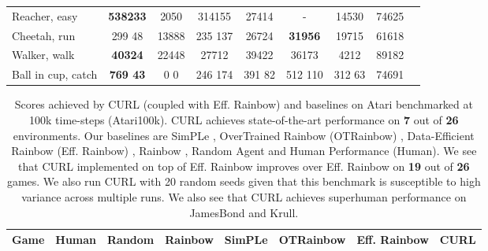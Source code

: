 \documentclass{article}
\begin{document}
\begin{table*}[ht]
\begin{center}
\begin{small}
\begin{sc}
\begin{tabular}{lcccccccc}
Reacher, easy    & \textbf{538233} & 2050 & 314155 & 27414 & - & 14530 & 74625 \\
Cheetah, run   & 299 48 & 13888& 235 137 & 26724 &  \textbf{31956} & 19715& 61618 \\
Walker, walk      & \textbf{40324}&  22448& 27712 & 39422 & 36173 &4212& 89182 \\
Ball in cup, catch  & \textbf{769  43} & 0   0 & 246  174 & 391 82 & 512  110 & 312 63 & 74691 \\ 
\bottomrule
\end{tabular}
\end{sc}
\end{small}
\end{center}
\vskip -0.1in
\end{table*}


\begin{table*}[h!]
\caption{Scores achieved by CURL (coupled with Eff. Rainbow) and baselines on Atari benchmarked at 100k time-steps (Atari100k). CURL achieves state-of-the-art performance on {\textbf{7}} out of {\textbf{26}} environments. Our baselines are SimPLe \cite{kaiser2019model}, OverTrained Rainbow (OTRainbow) \cite{kielak2020rainbow}, Data-Efficient Rainbow (Eff. Rainbow) \cite{van2019use}, Rainbow \cite{hessel2017rainbow}, Random Agent and Human Performance (Human). We see that CURL implemented on top of Eff. Rainbow improves over Eff. Rainbow on {\bf 19} out of {\bf 26} games. We also run CURL with 20 random seeds given that this benchmark is susceptible to high variance across multiple runs. We also see that CURL achieves superhuman performance on JamesBond and Krull.}

\label{table:100katariscores}
\vskip 0.15in
\begin{center}
\begin{small}
\begin{sc}
\begin{tabular}{lccccccc}
\toprule
Game & Human & Random  & Rainbow & SimPLe & OTRainbow & Eff. Rainbow  & CURL \\
\midrule


\end{tabular}
\end{sc}
\end{small}
\end{center}
\end{table*}
\end{document}
